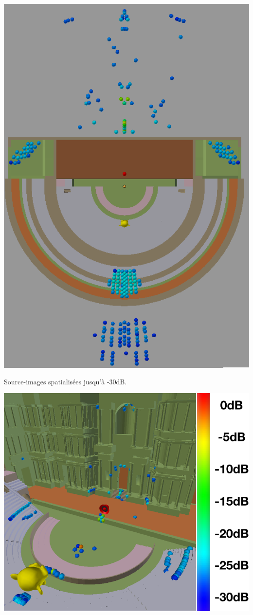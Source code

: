 \begin{figureth}	
	\begin{subfigureth}{0.37\textwidth}
		\includegraphics[width=\linewidth]{images/SI30dBbis}
		\caption{Source-images spatialisées jusqu'à -30dB.}
		\label{SI30dBbis}
	\end{subfigureth}
	\begin{subfigureth}{0.61\textwidth}
		\includegraphics[width=\linewidth]{images/SI30dB}

\end{subfigureth}
\end{figureth}
